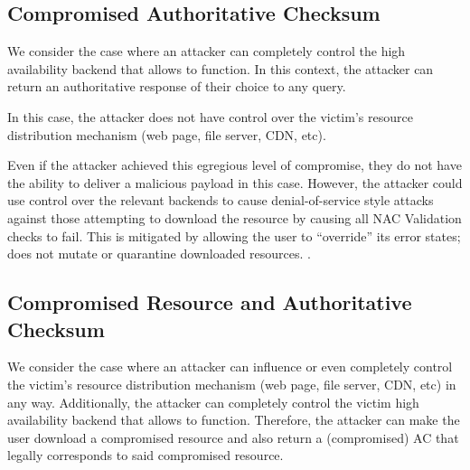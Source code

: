 \subsection{Compromised Authoritative Checksum}

We consider the case where an attacker can completely control the high
availability backend that allows \SYSTEM{} to function. In this context, the
attacker can return an authoritative response of their choice to any query.

In this case, the attacker does not have control over the victim's resource
distribution mechanism (web page, file server, CDN, etc).

Even if the attacker achieved this egregious level of compromise, they do not
have the ability to deliver a malicious payload in this case. However, the
attacker could use control over the relevant backends to cause denial-of-service
style attacks against those attempting to download the resource by causing all
NAC Validation checks to fail. This is mitigated by \SYSTEM{} allowing the user
to ``override'' its error states; \ie \SYSTEM{} does not mutate or quarantine
downloaded resources. .

\subsection{Compromised Resource and Authoritative Checksum}

We consider the case where an attacker can influence or even completely control
the victim's resource distribution mechanism (web page, file server, CDN, etc)
in any way. Additionally, the attacker can completely control the victim high
availability backend that allows \SYSTEM{} to function. Therefore, the attacker
can make the user download a compromised resource and also return a
(compromised) AC that legally corresponds to said compromised resource.
